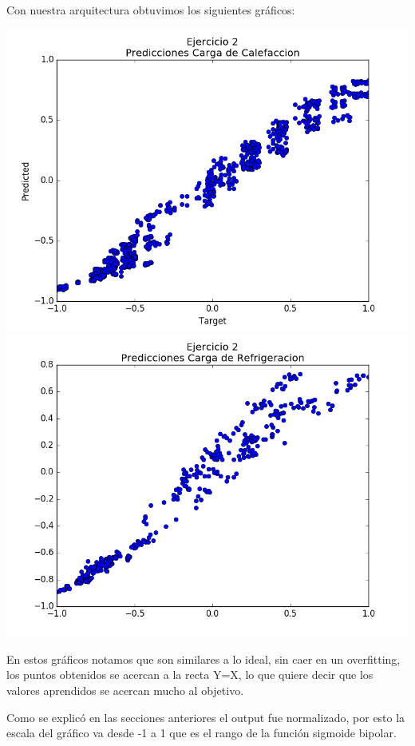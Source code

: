 Con nuestra arquitectura obtuvimos los siguientes gráficos:

\includegraphics[scale=0.4]{img/ej2-calef}
\includegraphics[scale=0.4]{img/ej2-refrig}


En estos gráficos notamos que son similares a lo ideal, sin caer en un overfitting, los puntos obtenidos se acercan a la recta Y=X, lo que quiere decir que los valores aprendidos se acercan mucho al objetivo.

Como se explicó en las secciones anteriores el output fue normalizado, por esto la escala del gráfico va desde -1 a 1 que es el rango de la función sigmoide bipolar.
